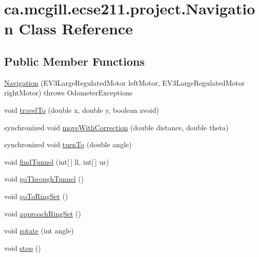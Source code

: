 \hypertarget{classca_1_1mcgill_1_1ecse211_1_1project_1_1_navigation}{}\section{ca.\+mcgill.\+ecse211.\+project.\+Navigation Class Reference}
\label{classca_1_1mcgill_1_1ecse211_1_1project_1_1_navigation}
\subsection*{Public Member Functions}
\begin{DoxyCompactItemize}
\item 
\hyperlink{classca_1_1mcgill_1_1ecse211_1_1project_1_1_navigation_aaee14b67c392ddd951e3ce21224c3e56}{Navigation} (E\+V3\+Large\+Regulated\+Motor left\+Motor, E\+V3\+Large\+Regulated\+Motor right\+Motor)  throws Odometer\+Exceptions 
\item 
void \hyperlink{classca_1_1mcgill_1_1ecse211_1_1project_1_1_navigation_ada8a324c1d391698164476d4d728f0c4}{travel\+To} (double x, double y, boolean avoid)
\item 
synchronized void \hyperlink{classca_1_1mcgill_1_1ecse211_1_1project_1_1_navigation_a48eeb9ae2da23664421e8da5642054c7}{move\+With\+Correction} (double distance, double theta)
\item 
synchronized void \hyperlink{classca_1_1mcgill_1_1ecse211_1_1project_1_1_navigation_a3bbe0645f2b3b3d0986b4a707fb5a00c}{turn\+To} (double angle)
\item 
void \hyperlink{classca_1_1mcgill_1_1ecse211_1_1project_1_1_navigation_ae0588f4dbf493a982171b8e7814bff37}{find\+Tunnel} (int\mbox{[}$\,$\mbox{]} ll, int\mbox{[}$\,$\mbox{]} ur)
\item 
void \hyperlink{classca_1_1mcgill_1_1ecse211_1_1project_1_1_navigation_a4b52e605d3ea2f9bcd9481ae2c69ba39}{go\+Through\+Tunnel} ()
\item 
void \hyperlink{classca_1_1mcgill_1_1ecse211_1_1project_1_1_navigation_a0016a23ab5d544148a09948fb1a40e4c}{go\+To\+Ring\+Set} ()
\item 
void \hyperlink{classca_1_1mcgill_1_1ecse211_1_1project_1_1_navigation_a1d8075346dbc151ca366e211e9056ccc}{approach\+Ring\+Set} ()
\item 
void \hyperlink{classca_1_1mcgill_1_1ecse211_1_1project_1_1_navigation_af2bddd9a34ea26cfd9a1e4ac055644dc}{rotate} (int angle)
\item 
void \hyperlink{classca_1_1mcgill_1_1ecse211_1_1project_1_1_navigation_ae8530d181ffd790ff9dea5eeab54b1a1}{stop} ()
\end{DoxyCompactItemize}
